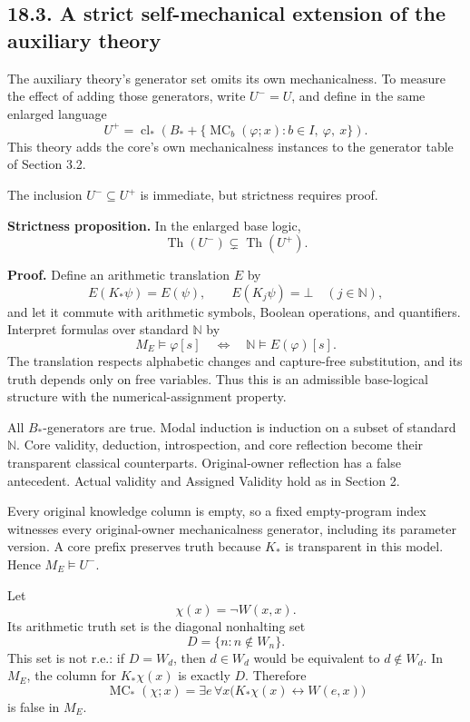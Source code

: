 \documentclass[
  11pt,
  letterpaper,
]{article}
\begin{document}
\subsection{18.3. A strict self-mechanical extension of the auxiliary
theory}\label{a-strict-self-mechanical-extension-of-the-auxiliary-theory}

The auxiliary theory's generator set omits its own mechanicalness. To
measure the effect of adding those generators, write \(U^-=U\), and
define in the same enlarged language \[
U^+=\operatorname{cl}_*\left(
 B_*+\{\operatorname{MC}_b(\varphi;x):b\in I,\ \varphi,\ x\}
\right).
\tag{P3}
\] This theory adds the core's own mechanicalness instances to the
generator table of Section 3.2.

The inclusion \(U^-\subseteq U^+\) is immediate, but strictness requires
proof.

\textbf{Strictness proposition.} In the enlarged base logic, \[
\operatorname{Th}(U^-)\subsetneq\operatorname{Th}(U^+).
\]

\textbf{Proof.} Define an arithmetic translation \(E\) by \[
E(K_*\psi)=E(\psi),\qquad
E(K_j\psi)=\bot\quad(j\in\mathbb N),
\] and let it commute with arithmetic symbols, Boolean operations, and
quantifiers. Interpret formulas over standard \(\mathbb N\) by \[
M_E\models\varphi[s]\quad\Longleftrightarrow\quad
\mathbb N\models E(\varphi)[s].
\] The translation respects alphabetic changes and capture-free
substitution, and its truth depends only on free variables. Thus this is
an admissible base-logical structure with the numerical-assignment
property.

All \(B_*\)-generators are true. Modal induction is induction on a
subset of standard \(\mathbb N\). Core validity, deduction,
introspection, and core reflection become their transparent classical
counterparts. Original-owner reflection has a false antecedent. Actual
validity and Assigned Validity hold as in Section 2.

Every original knowledge column is empty, so a fixed empty-program index
witnesses every original-owner mechanicalness generator, including its
parameter version. A core prefix preserves truth because \(K_*\) is
transparent in this model. Hence \(M_E\models U^-\).

Let \[
\chi(x)=\neg W(x,x).
\] Its arithmetic truth set is the diagonal nonhalting set \[
D=\{n:n\notin W_n\}.
\] This set is not r.e.: if \(D=W_d\), then \(d\in W_d\) would be
equivalent to \(d\notin W_d\). In \(M_E\), the column for \(K_*\chi(x)\)
is exactly \(D\). Therefore \[
\operatorname{MC}_*(\chi;x)=
\exists e\,\forall x
 \bigl(K_*\chi(x)\leftrightarrow W(e,x)\bigr)
\tag{P4}
\] is false in \(M_E\).
\end{document}
